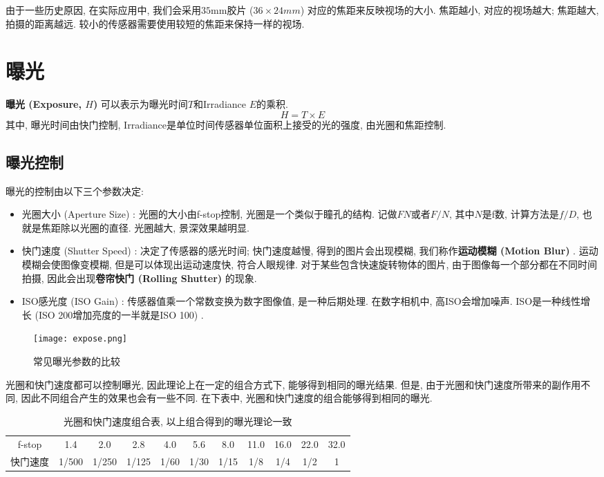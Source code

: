 由于一些历史原因, 在实际应用中, 我们会采用$35$mm胶片 ($36\times 24 mm$) 对应的焦距来反映视场的大小. 焦距越小, 对应的视场越大; 焦距越大, 拍摄的距离越远. 较小的传感器需要使用较短的焦距来保持一样的视场. 

\section{曝光}

\textbf{曝光 (Exposure, $H$) }可以表示为曝光时间$T$和Irradiance $E$的乘积. 
\begin{equation}
	H=T\times E
\end{equation}
其中, 曝光时间由快门控制, Irradiance是单位时间传感器单位面积上接受的光的强度, 由光圈和焦距控制. 

\subsection{曝光控制}

曝光的控制由以下三个参数决定: 
\begin{itemize}
	\item 光圈大小 (Aperture Size) : 光圈的大小由f-stop控制, 光圈是一个类似于瞳孔的结构. 记做$FN$或者$F/N$, 其中$N$是f数, 计算方法是$f/D$, 也就是焦距除以光圈的直径. 光圈越大, 景深效果越明显. 
	\item 快门速度 (Shutter Speed) : 决定了传感器的感光时间; 快门速度越慢, 得到的图片会出现模糊, 我们称作\textbf{运动模糊 (Motion Blur) }. 运动模糊会使图像变模糊, 但是可以体现出运动速度快, 符合人眼规律. 对于某些包含快速旋转物体的图片, 由于图像每一个部分都在不同时间拍摄, 因此会出现\textbf{卷帘快门 (Rolling Shutter) }的现象. 
	\item ISO感光度 (ISO Gain) : 传感器值乘一个常数变换为数字图像值, 是一种后期处理. 在数字相机中, 高ISO会增加噪声. ISO是一种线性增长 (ISO 200增加亮度的一半就是ISO 100) . 
\end{itemize}

\begin{figure}[H]
	\centering
	\texttt{[image: expose.png]}
	\caption{常见曝光参数的比较}
	\label{fig:expose}
\end{figure}

光圈和快门速度都可以控制曝光, 因此理论上在一定的组合方式下, 能够得到相同的曝光结果. 但是, 由于光圈和快门速度所带来的副作用不同, 因此不同组合产生的效果也会有一些不同. 在下表中, 光圈和快门速度的组合能够得到相同的曝光. 

\begin{table}[H]
	\centering
	\begin{tabular}{ccccccccccc}
		\hline
		f-stop & 1.4   & 2.0   & 2.8   & 4.0  & 5.6  & 8.0  & 11.0 & 16.0 & 22.0 & 32.0 \\
		快门速度   & 1/500 & 1/250 & 1/125 & 1/60 & 1/30 & 1/15 & 1/8  & 1/4  & 1/2  & 1 \\	\hline
	\end{tabular}
	\caption{光圈和快门速度组合表, 以上组合得到的曝光理论一致}
\end{table}

